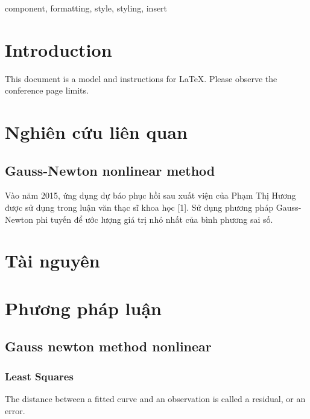 \documentclass[conference]{IEEEtran}
\begin{document}
\begin{abstract}
    This document is a model and instructions for \LaTeX.
    This and the IEEEtran.cls file define the components of your paper [title, text, heads, etc.]. *CRITICAL: Do Not Use Symbols, Special Characters, Footnotes,
    or Math in Paper Title or Abstract.
\end{abstract}

\begin{IEEEkeywords}
    component, formatting, style, styling, insert
\end{IEEEkeywords}

\section{Introduction}
This document is a model and instructions for \LaTeX.
Please observe the conference page limits.

\section{Nghiên cứu liên quan}

\subsection{Gauss-Newton nonlinear method}

Vào năm 2015, ứng dụng dự báo phục hồi sau xuất viện của Phạm Thị Hương được
sử dụng trong luận văn thạc sĩ khoa học [1]. Sử dụng phương pháp Gauss-Newton
phi tuyến để ước lượng giá trị nhỏ nhất của bình phương sai số. \cite{b1}



\section{Tài nguyên}
\section{Phương pháp luận}
\subsection{Gauss newton method nonlinear}
\subsubsection{Least Squares}
The distance between a fitted curve and an observation is called a residual, or an error.
\end{document}
